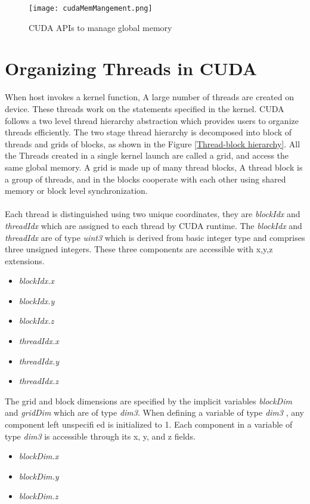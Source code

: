 \begin{figure}[h!]
  \centering
  \texttt{[image: cudaMemMangement.png]}
  \caption{CUDA APIs to manage global memory}
  \label{Memory management}
\end{figure}
\section{Organizing Threads in CUDA}
When host invokes a kernel function, A large number of threads are created on device. These threads work on the statements specified in the kernel. CUDA follows a two level thread hierarchy abstraction which provides users to organize threads efficiently. The two stage thread hierarchy is decomposed into block of threads and grids of blocks, as shown in the Figure \ref{Thread-block hierarchy}. All the Threads created in a single kernel launch are called a grid, and access the same global memory. A grid is made up of many thread blocks, A thread block is a group of threads, and in the blocks cooperate with each other using shared memory or block level synchronization.\paragraph*{}Each thread is distinguished using two unique 	coordinates, they are \textit{blockIdx} and \textit{threadIdx} which are assigned to each thread by CUDA runtime. The \textit{blockIdx} and \textit{threadIdx} are of type \textit{uint3} which is derived from basic integer type and comprises three unsigned integers. These three components are accessible with x,y,z extensions.
\begin{itemize}
\item \textit{blockIdx.x}
\item \textit{blockIdx.y}
\item \textit{blockIdx.z}
\item \textit{threadIdx.x}
\item \textit{threadIdx.y}
\item \textit{threadIdx.z}
\end{itemize}
The grid and block dimensions are specified by the implicit variables \textit{blockDim} and \textit{gridDim} which are of type \textit{dim3}. When defining a variable of type \textit{dim3 }, any component left unspecifi ed is initialized to 1. Each component in a variable of type \textit{dim3} is accessible through its x, y, and z fields.
\begin{itemize}
\item \textit{blockDim.x}
\item \textit{blockDim.y}
\item \textit{blockDim.z}
\end{itemize}
